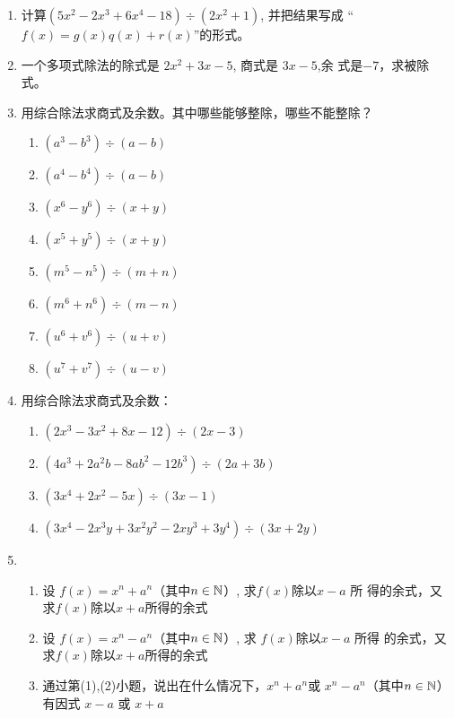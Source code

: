 \begin{enumerate}
    \item 计算$(5x^2-2x^3+6x^4-18)\div(2x^2+1)$, 并把结果写成
    “$f(x)=g(x)q(x)+r(x)$”的形式。
    \item 一个多项式除法的除式是 $2x^2+3x-5$, 商式是 $3x-5$,余
    式是$-7$，求被除式。
    \item 用综合除法求商式及余数。其中哪些能够整除，哪些不能整除？
\begin{multicols}{2}
\begin{enumerate}[(1)]
\item $( a^{3}- b^{3}) \div ( a- b) $
\item $( a^{4}- b^{4}) \div ( a- b)$  
\item $( x^{6}- y^{6}) \div ( x+ y)$ 
\item  $( x^{5}+ y^{5}) \div ( x+ y)$ 
\item $( m^{5}- n^{5}) \div ( m+ n) $ 
\item $( m^{6}+ n^{6}) \div ( m- n)$  
\item $( u^{6}+ v^{6}) \div ( u+ v)$  
\item $( u^{7}+ v^{7}) \div ( u- v) $
\end{enumerate}
\end{multicols}

    \item 用综合除法求商式及余数：
\begin{enumerate}[(1)]
\item  $( 2x^{3}- 3x^{2}+ 8x- 12) \div ( 2x- 3)$ 
\item $( 4a^{3}+ 2a^{2}b- 8ab^{2}- 12b^{3}) \div ( 2a+ 3b)$ 
\item $( 3x^{4}+ 2x^{2}- 5x) \div ( 3x- 1)$ 
\item  $( 3x^{4}- 2x^{3}y+ 3x^{2}y^{2}- 2xy^{3}+ 3y^{4}) \div ( 3x+ 2y)$
\end{enumerate}

    \item \begin{enumerate}[(1)]
    \item 设 $f(x)=x^n+a^n$（其中$n\in \mathbb{N}$）, 求$f(x)$除以$x-a$ 所
    得的余式，又求$f(x)$除以$x+a$所得的余式
    \item 设 $f(x)=x^n-a^n$（其中$n\in \mathbb{N}$）, 求 $f(x)$除以$x-a$ 所得
    的余式，又求$f(x)$除以$x+a$所得的余式
    \item 通过第(1),(2)小题，说出在什么情况下，$x^n+a^n$或
    $x^n-a^n$（其中$n\in \mathbb{N}$）有因式 $x-a$ 或 $x+a$
    \end{enumerate}


\end{enumerate}
